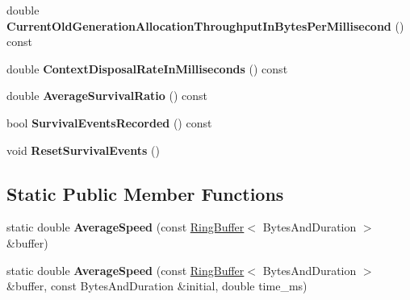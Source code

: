 \begin{DoxyCompactItemize}
\item 
double {\bfseries Current\+Old\+Generation\+Allocation\+Throughput\+In\+Bytes\+Per\+Millisecond} () const \hypertarget{classv8_1_1internal_1_1_g_c_tracer_a67b835b11f06c8340917f80e5333192b}{}\label{classv8_1_1internal_1_1_g_c_tracer_a67b835b11f06c8340917f80e5333192b}

\item 
double {\bfseries Context\+Disposal\+Rate\+In\+Milliseconds} () const \hypertarget{classv8_1_1internal_1_1_g_c_tracer_a45dc7e0dfa57b240597c9ecbb433fde3}{}\label{classv8_1_1internal_1_1_g_c_tracer_a45dc7e0dfa57b240597c9ecbb433fde3}

\item 
double {\bfseries Average\+Survival\+Ratio} () const \hypertarget{classv8_1_1internal_1_1_g_c_tracer_ae8e7a335f410755b1a65e169759d694f}{}\label{classv8_1_1internal_1_1_g_c_tracer_ae8e7a335f410755b1a65e169759d694f}

\item 
bool {\bfseries Survival\+Events\+Recorded} () const \hypertarget{classv8_1_1internal_1_1_g_c_tracer_a7ec593fbdb3a5b922379b9eac5b6324b}{}\label{classv8_1_1internal_1_1_g_c_tracer_a7ec593fbdb3a5b922379b9eac5b6324b}

\item 
void {\bfseries Reset\+Survival\+Events} ()\hypertarget{classv8_1_1internal_1_1_g_c_tracer_ac1db0a1e645e1a274bebff9a69dd6877}{}\label{classv8_1_1internal_1_1_g_c_tracer_ac1db0a1e645e1a274bebff9a69dd6877}

\end{DoxyCompactItemize}
\subsection*{Static Public Member Functions}
\begin{DoxyCompactItemize}
\item 
static double {\bfseries Average\+Speed} (const \hyperlink{classv8_1_1internal_1_1_ring_buffer}{Ring\+Buffer}$<$ Bytes\+And\+Duration $>$ \&buffer)\hypertarget{classv8_1_1internal_1_1_g_c_tracer_ab91aedb327446712f65dd56611de667f}{}\label{classv8_1_1internal_1_1_g_c_tracer_ab91aedb327446712f65dd56611de667f}

\item 
static double {\bfseries Average\+Speed} (const \hyperlink{classv8_1_1internal_1_1_ring_buffer}{Ring\+Buffer}$<$ Bytes\+And\+Duration $>$ \&buffer, const Bytes\+And\+Duration \&initial, double time\+\_\+ms)\hypertarget{classv8_1_1internal_1_1_g_c_tracer_a22cc189a38398a036c59e4a62840b9ff}{}\label{classv8_1_1internal_1_1_g_c_tracer_a22cc189a38398a036c59e4a62840b9ff}

\end{DoxyCompactItemize}
